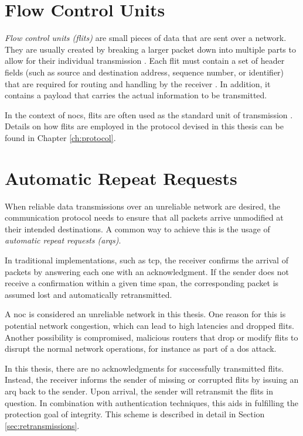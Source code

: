 %
\section{Flow Control Units}\label{sec:flits}
\textit{Flow control units (flits)} are small pieces of data that are sent over a network. They are usually created by breaking a larger
packet down into multiple parts to allow for their individual transmission \cite[6]{flitslecturecmu}. Each flit must contain a set of header fields (such as source and
destination address, sequence number, or identifier) that are required for routing and handling by the receiver \cite[2]{flitslectureutah}.
In addition, it contains a payload that carries the actual information to be transmitted.

In the context of \glspl{noc}, flits are often used as the standard unit of transmission \cite[51\psqq]{tatas16designingnocs}. Details on how flits
are employed in the protocol devised in this thesis can be found in Chapter \ref{ch:protocol}.

\section{Automatic Repeat Requests}\label{sec:arqs}
When reliable data transmissions over an unreliable network are desired, the communication protocol needs to ensure that all packets arrive unmodified
at their intended destinations. A common way to achieve this is the usage of \textit{automatic repeat requests (\glspl{arq})}.

In traditional implementations, such as \gls{tcp}, the receiver confirms the arrival of packets by answering each one with an acknowledgment.
If the sender does not receive a confirmation within a given time span, the corresponding packet is assumed lost and automatically retransmitted.

A \gls{noc} is considered an unreliable network in this thesis. One reason for this is potential network congestion, which can lead to high latencies
and dropped flits. Another possibility is compromised, malicious routers that drop or modify flits to disrupt the normal network operations, for
instance as part of a \gls{dos} attack.

In this thesis, there are no acknowledgments for successfully transmitted flits. Instead, the receiver informs the sender of missing or corrupted
flits by issuing an \gls{arq} back to the sender. Upon arrival, the sender will retransmit the flits in question. In combination with
authentication techniques, this aids in fulfilling the protection goal of integrity. This scheme is described in detail in Section
\ref{sec:retransmissions}.

